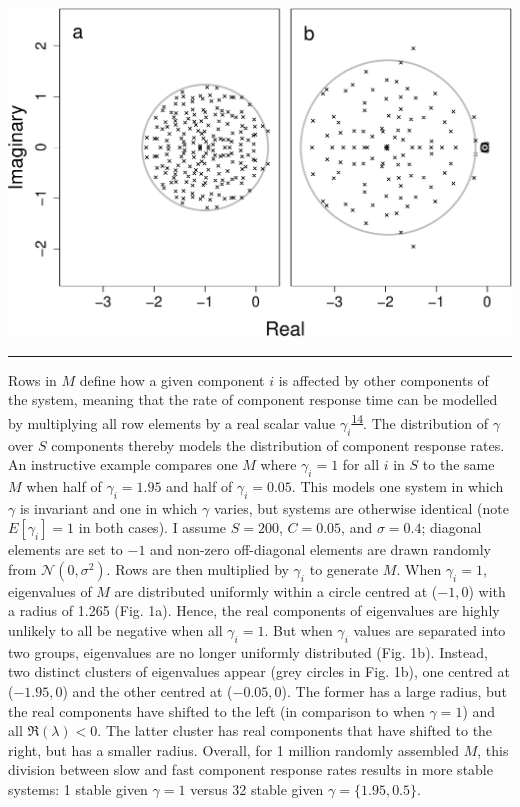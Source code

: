 \documentclass[]{article}
\begin{document}
\includegraphics{unnamed-chunk-4-1.pdf}

\begin{center}\rule{0.5\linewidth}{\linethickness}\end{center}

Rows in \(M\) define how a given component \(i\) is affected by other
components of the system, meaning that the rate of component response
time can be modelled by multiplying all row elements by a real scalar
value
\(\gamma_{i}\)\textsuperscript{\protect\hyperlink{ref-Patel2018}{14}}.
The distribution of \(\gamma\) over \(S\) components thereby models the
distribution of component response rates. An instructive example
compares one \(M\) where \(\gamma_{i} = 1\) for all \(i\) in \(S\) to
the same \(M\) when half of \(\gamma_{i} = 1.95\) and half of
\(\gamma_{i} = 0.05\). This models one system in which \(\gamma\) is
invariant and one in which \(\gamma\) varies, but systems are otherwise
identical (note \(E[\gamma_{i}] = 1\) in both cases). I assume
\(S = 200\), \(C = 0.05\), and \(\sigma = 0.4\); diagonal elements are
set to \(-1\) and non-zero off-diagonal elements are drawn randomly from
\(\mathcal{N}(0, \sigma^{2})\). Rows are then multiplied by
\(\gamma_{i}\) to generate \(M\). When \(\gamma_{i} = 1\), eigenvalues
of \(M\) are distributed uniformly within a circle centred at
(\(-1, 0\)) with a radius of 1.265 (Fig. 1a). Hence, the real components
of eigenvalues are highly unlikely to all be negative when all
\(\gamma_{i} = 1\). But when \(\gamma_{i}\) values are separated into
two groups, eigenvalues are no longer uniformly distributed (Fig. 1b).
Instead, two distinct clusters of eigenvalues appear (grey circles in
Fig. 1b), one centred at (\(-1.95, 0\)) and the other centred at
(\(-0.05, 0\)). The former has a large radius, but the real components
have shifted to the left (in comparison to when \(\gamma = 1\)) and all
\(\Re({\lambda}) < 0\). The latter cluster has real components that have
shifted to the right, but has a smaller radius. Overall, for 1 million
randomly assembled \(M\), this division between slow and fast component
response rates results in more stable systems: 1 stable given
\(\gamma = 1\) versus 32 stable given \(\gamma = \{1.95, 0.5\}\).
\end{document}

